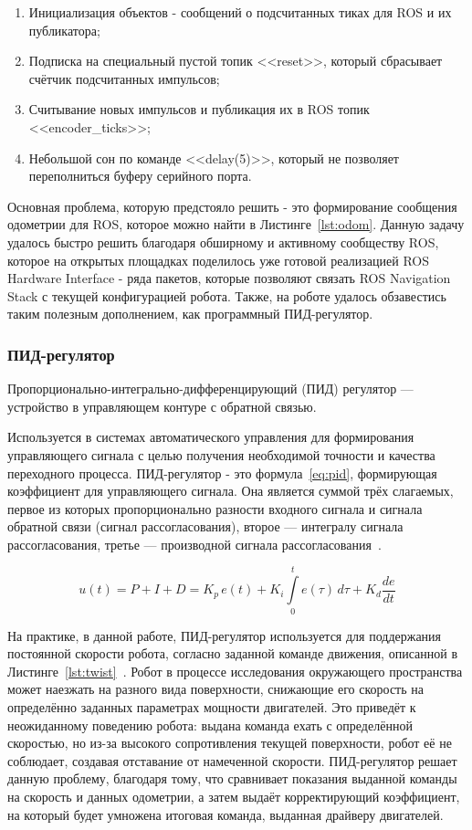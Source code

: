 \begin{enumerate}[beginpenalty=10000] %
  \item Инициализация объектов - сообщений о подсчитанных тиках для ROS и их публикатора;
  \item Подписка на специальный пустой топик <<reset>>, который сбрасывает счётчик подсчитанных импульсов;
  \item Считывание новых импульсов и публикация их в ROS топик <<encoder\_ticks>>; 
  \item Небольшой сон по команде <<delay(5)>>, который не позволяет переполниться буферу серийного порта.
\end{enumerate}

Основная проблема, которую предстояло решить - это формирование сообщения одометрии для ROS, которое можно найти в Листинге~\cref{lst:odom}\cite{odom}. Данную задачу удалось быстро решить благодаря обширному и активному сообществу ROS, которое на открытых площадках поделилось уже готовой реализацией ROS Hardware Interface - ряда пакетов, которые позволяют связать ROS Navigation Stack с текущей конфигурацией робота. Также, на роботе удалось обзавестись таким полезным дополнением, как программный ПИД-регулятор.

\subsubsection{ПИД-регулятор} 
Пропорционально-интегрально-дифференцирующий (ПИД) регулятор — устройство в управляющем контуре с обратной связью. 

Используется в системах автоматического управления для формирования управляющего сигнала с целью получения необходимой точности и качества переходного процесса. ПИД-регулятор - это формула~\cref{eq:pid}, формирующая коэффициент для управляющего сигнала. Она является суммой трёх слагаемых, первое из которых пропорционально разности входного сигнала и сигнала обратной связи (сигнал рассогласования), второе — интегралу сигнала рассогласования, третье — производной сигнала рассогласования~\cite{pid}. 

\begin{equation}
    \label{eq:pid}
    u(t)=P+I+D=K_{p}\,{e(t)}+K_{i}\int \limits _{0}^{t}{e(\tau )}\,{d\tau }+K_{d}{\frac {de}{dt}}
\end{equation}

На практике, в данной работе, ПИД-регулятор используется для поддержания постоянной скорости робота, согласно заданной команде движения, описанной в Листинге~\cref{lst:twist}~\cite{twist}. Робот в процессе исследования окружающего пространства может наезжать на разного вида поверхности, снижающие его скорость на определённо заданных параметрах мощности двигателей. Это приведёт к неожиданному поведению робота: выдана команда ехать с определённой скоростью, но из-за высокого сопротивления текущей поверхности, робот её не соблюдает, создавая отставание от намеченной скорости. ПИД-регулятор решает данную проблему, благодаря тому, что сравнивает показания выданной команды на скорость и данных одометрии, а затем выдаёт корректирующий коэффициент, на который будет умножена итоговая команда, выданная драйверу двигателей.

